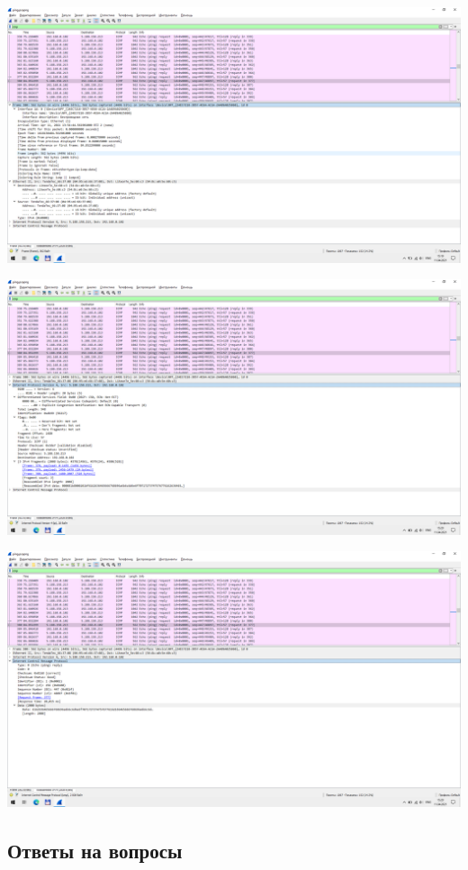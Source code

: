 \begin{center}
    \includegraphics[width=\textwidth]{screenshots/ping_2000_response_1}

    \includegraphics[width=\textwidth]{screenshots/ping_2000_response_2}

    \includegraphics[width=\textwidth]{screenshots/ping_2000_response_3}

\end{center}

\subsection{Ответы на вопросы}

